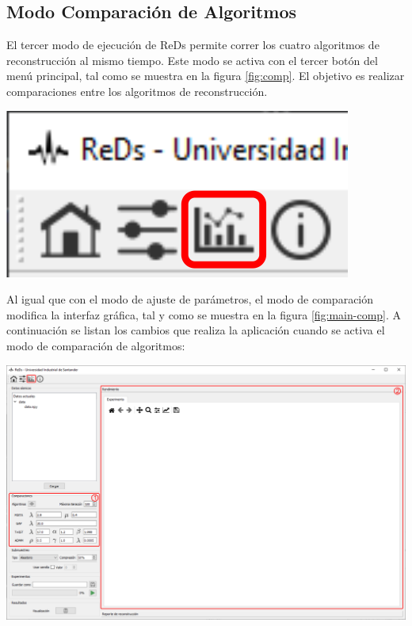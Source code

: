 \documentclass[12pt,twoside,letter]{ol-softwaremanual}
\newenvironment{Figure}
  {\par\medskip\noindent\minipage{\linewidth}}
  {\endminipage\par\medskip}
\begin{document}
\subsection{Modo Comparación de Algoritmos}

\begin{multicols}{2}

El tercer modo de ejecución de ReDs permite correr los cuatro algoritmos de reconstrucción al mismo tiempo. Este modo se activa con el tercer botón del menú principal, tal como se muestra en la figura \ref{fig:comp}. El objetivo es realizar comparaciones entre los algoritmos de reconstrucción.
\vfill\null
\columnbreak
\begin{Figure}
	\centering
	\includegraphics[width=0.4\linewidth]{comp-tab.png}
	\label{fig:comp}
\end{Figure}
\end{multicols}
Al igual que con el modo de ajuste de parámetros, el modo de comparación modifica la interfaz gráfica, tal y como se muestra en la figura \ref{fig:main-comp}. A continuación se listan los cambios que realiza la aplicación cuando se activa el modo de comparación de algoritmos:

\begin{Figure}
	\centering
	\includegraphics[width=1\linewidth]{main-comp.png}
	\label{fig:main-comp}
\end{Figure}
\end{document}
